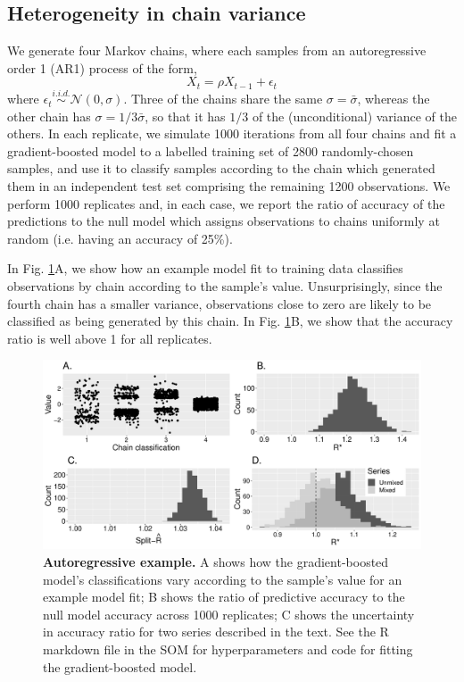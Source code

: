 \documentclass{article}
\begin{document}
\subsection{Heterogeneity in chain variance}\label{sec:heterogeneity}
We generate four Markov chains, where each samples from an autoregressive order 1 (AR1) process of the form,
%
\begin{equation}
X_t = \rho X_{t-1} + \epsilon_t
\end{equation}
%
where $\epsilon_t\stackrel{i.i.d.}{\sim}\mathcal{N}(0, \sigma)$. Three of the chains share the same $\sigma=\bar{\sigma}$, whereas the other chain has $\sigma=1/3\bar{\sigma}$, so that it has $1/3$ of the (unconditional) variance of the others. In each replicate, we simulate 1000 iterations from all four chains and fit a gradient-boosted model to a labelled training set of 2800 randomly-chosen samples, and use it to classify samples according to the chain which generated them in an independent test set comprising the remaining 1200 observations. We perform 1000 replicates and, in each case, we report the ratio of accuracy of the predictions to the null model which assigns observations to chains uniformly at random (i.e. having an accuracy of 25\%).

In Fig. \ref{fig:ar1}A, we show how an example model fit to training data classifies observations by chain according to the sample's value. Unsurprisingly, since the fourth chain has a smaller variance, observations close to zero are likely to be classified as being generated by this chain. In Fig. \ref{fig:ar1}B, we show that the accuracy ratio is well above 1 for all replicates.

\begin{figure}[h]
	\centerline{\includegraphics[width=1.0\textwidth]{../output/ar1.pdf}}
	\caption{\textbf{Autoregressive example.} A shows how the gradient-boosted model's classifications vary according to the sample's value for an example model fit; B shows the ratio of predictive accuracy to the null model accuracy across 1000 replicates; C shows the uncertainty in accuracy ratio for two series described in the text. See the R markdown file in the SOM for hyperparameters and code for fitting the gradient-boosted model.}
	\label{fig:ar1}
\end{figure}
\end{document}
